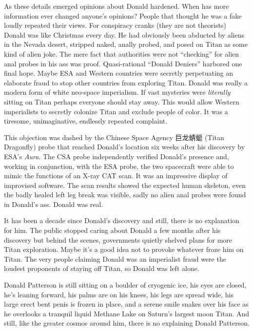 As these details emerged opinions about Donald hardened. When has more
information ever changed anyone's opinions? People that thought he was a
fake loudly repeated their views. For conspiracy cranks (they are not
theorists) Donald was like Christmas every day. He had obviously been
abducted by aliens in the Nevada desert, stripped naked, anally probed,
and posed on Titan as some kind of alien joke. The mere fact that
authorities were not ``checking'' for alien anal probes in his ass was
proof. Quasi-rational ``Donald Deniers'' harbored one final hope. Maybe
ESA and Western countries were secretly perpetuating an elaborate fraud
to stop other countries from exploring Titan. Donald was really a modern
form of white neo-space imperialism. If vast mysteries were
\emph{literally} sitting on Titan perhaps everyone should stay away.
This would allow Western imperialists to secretly colonize Titan and
exclude people of color. It was a tiresome, unimaginative, endlessly
repeated complaint.

This objection was dashed by the Chinese Space Agency {\myAsian 巨龙蜻蜓} (Titan
Dragonfly) probe that reached Donald's location six weeks after his
discovery by ESA's \emph{Aura}. The CSA probe independently verified
Donald's presence and, working in conjunction, with the ESA probe, the
two spacecraft were able to mimic the functions of an X-ray CAT scan. It
was an impressive display of improvised software. The scan results
showed the expected human skeleton, even the badly healed left leg break
was visible, sadly no alien anal probes were found in Donald's ass.
Donald was real.

It has been a decade since Donald's discovery and still, there is no
explanation for him. The public stopped caring about Donald a few months
after his discovery but behind the scenes, governments quietly shelved
plans for more Titan exploration. Maybe it's a good idea not to provoke
whatever froze him on Titan. The very people claiming Donald was an
imperialist fraud were the loudest proponents of staying off Titan, so
Donald was left alone.

Donald Patterson is still sitting on a boulder of cryogenic ice, his
eyes are closed, he's leaning forward, his palms are on his knees, his
legs are spread wide, his large erect bent penis is frozen in place, and
a serene smile snakes over his face as he overlooks a tranquil liquid
Methane Lake on Saturn's largest moon Titan. And still, like the greater
cosmos around him, there is no explaining Donald Patterson.


%
 

